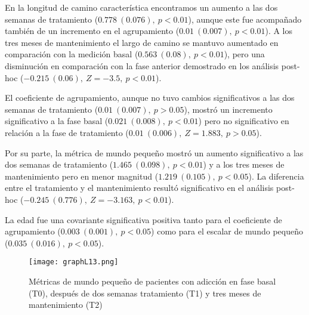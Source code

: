 En la longitud de camino característica encontramos un aumento a las dos semanas de tratamiento ($0.778\ (0.076),\ p<0.01$), aunque este fue acompañado también de un incremento en el agrupamiento ($0.01\ (0.007),\ p<0.01$). A los tres meses de mantenimiento el largo de camino se mantuvo aumentado en comparación con la medición basal ($0.563\ (0.08),\ p<0.01$), pero una disminución en comparación con la fase anterior demostrado en los análisis post-hoc ($-0.215\ (0.06),\ Z=-3.5,\ p<0.01$). \par
El coeficiente de agrupamiento, aunque no tuvo cambios significativos a las dos semanas de tratamiento ($0.01\ (0.007),\ p>0.05$), mostró un incremento significativo a la fase basal ($0.021\ (0.008),\ p<0.01$) pero no significativo en relación a la fase de tratamiento ($0.01\ (0.006),\ Z=1.883,\ p>0.05$).\par
Por su parte, la métrica de mundo pequeño mostró un aumento significativo a las dos semanas de tratamiento ($1.465\ (0.098),\ p<0.01$) y a los tres meses de mantenimiento pero en menor magnitud ($1.219\ (0.105),\ p<0.05$). La diferencia entre el tratamiento y el mantenimiento resultó significativo en el análisis post-hoc ($-0.245\ (0.776),\ Z=-3.163,\ p<0.01$). \par
La edad fue una covariante significativa positiva tanto para el coeficiente de agrupamiento ($0.003\ (0.001),\ p<0.05$) como para el escalar de mundo pequeño ($0.035\ (0.016),\ p<0.05$).

\begin{figure}[!htb]
    \centering
    \texttt{[image: graphL13.png]}
    \caption{Métricas de mundo pequeño de pacientes con adicción en fase basal (T0), después de dos semanas tratamiento (T1) y tres meses de mantenimiento (T2)}
    \label{fig:gpL13}
\end{figure}


